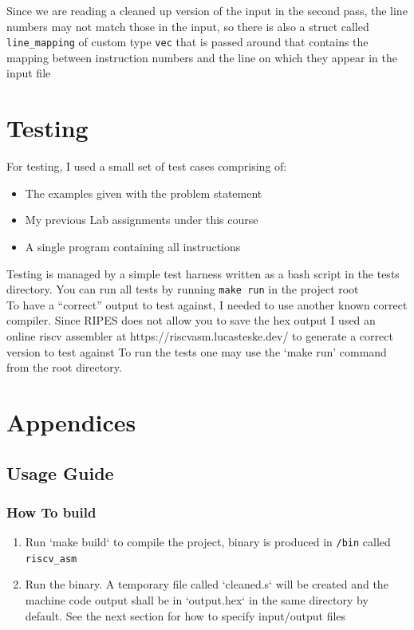 \documentclass[12pt]{article}
\begin{document}
    Since we are reading a cleaned up version of the input in the second pass, the line numbers may not match those in the input, so there is also a struct called \verb|line_mapping| of custom type \verb|vec| that is passed around that contains the mapping between instruction numbers and the line on which they appear in the input file

    \section{Testing}
    For testing, I used a small set of test cases comprising of:
    
	\begin{itemize}
		\item{The examples given with the problem statement}
		\item{My previous Lab assignments under this course}
		\item{A single program containing all instructions}
	\end{itemize}
	
 Testing is managed by a simple test harness written as a bash script in the tests directory. You can run all tests by running \verb|make run| in the project root\\
	To have a ``correct'' output to test against, I needed to use another known correct compiler. Since RIPES does not allow you to save the hex output I used an online riscv assembler at https://riscvasm.lucasteske.dev/ to generate a correct version to test against
	To run the tests one may use the `make run' command from the root directory.

    \newpage
    \appendix
    \section*{Appendices}
    \renewcommand{\thesubsection}{\Alph{subsection}}
    
    \subsection{Usage Guide}

    \subsubsection*{How To build}
    \begin{enumerate}
        \item Run `make build` to compile the project, binary is produced in \verb#/bin# called \verb#riscv_asm#
        \item Run the binary. A temporary file called `cleaned.s` will be created and the machine code output shall be in `output.hex` in the same directory by default. 
    See the next section for how to specify input/output files
    \end{enumerate}
    
\end{document}
